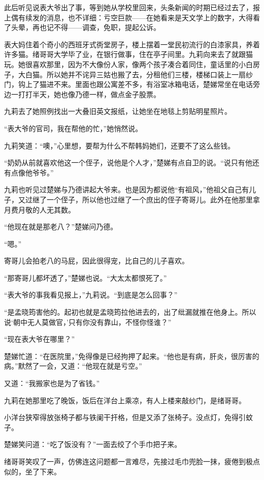 \par 此后听见说表大爷出了事，等到她从学校里回来，头条新闻的时期已经过去了，报上偶有续发的消息，也不详细：亏空巨款——在她看来是天文学上的数字，大得看了头晕，再也记不得——调查，免职，提起公诉。
\par 表大妈住着个奇小的西班牙式衖堂房子，楼上摆着一堂民初流行的白漆家具，养着许多猫。绪哥哥大学毕了业，在银行做事，住在亭子间里。九莉向来去了就跟猫玩。她很喜欢那里，因为不大像份人家，像两个孩子凑合着同住，童话里的小白房子，大白猫。所以她并不诧异三姑也搬了去，分租他们三楼，楼梯口装上一扇纱门，钩上了猫进不来。里面也跟公寓差不多，有浴室冰箱电话，楚娣常坐在电话旁边一打打半天，她也像乃德一样，做点金子股票。
\par 九莉去了她照例找出一大叠旧英文报纸，让她坐在地毯上剪贴明星照片。
\par “表大爷的官司，我在帮他的忙，”她悄然说。
\par 九莉笑道：“噢，”心里想，要帮为什么不帮韩妈她们，还要不了这么些钱。
\par “奶奶从前就喜欢他这一个侄子，说他是个人才，”楚娣有点自卫的说。“说只有他还有点像他爷爷。”
\par 九莉也听见过楚娣与乃德讲起大爷来。也是因为都说他“有祖风，”他祖父自己有儿子，又过继了一个侄子，所以他也过继了一个庶出的侄子寄哥儿。此外在他那里拿月费月敬的人无其数。
\par “他现在就是那老八？”楚娣问乃德。
\par “嗯。”
\par 寄哥儿会拍老八的马屁，因此很得宠，比自己的儿子喜欢。
\par “那寄哥儿都坏透了，”楚娣也说。“大太太都恨死了。”
\par “表大爷的事我看见报上，”九莉说。“到底是怎么回事？”
\par “是孟晓筠害他的。起初也就是孟晓筠拉他进去的，出了纰漏就推在他身上。所以说‘朝中无人莫做官，’只有你没有靠山，不怪你怪谁？”
\par “现在表大爷在哪里？”
\par 楚娣忙道：“在医院里，”免得像是已经拘押了起来。“他也是有病，肝炎，很厉害的病。”默然了一会，又道：“他现在就是亏空。”
\par 又道：“我搬家也是为了省钱。”
\par 九莉在她那里吃了晚饭，饭后在洋台上乘凉，有人上楼来敲纱门，是绪哥哥。
\par 小洋台狭窄得放张椅子都与铁阑干扞格，但是又添了张椅子。没点灯，免得引蚊子。
\par 楚娣笑问道：“吃了饭没有？”一面去绞了个手巾把子来。
\par 绪哥哥笑叹了一声，仿佛连这问题都一言难尽，先接过毛巾兜脸一抹，疲倦到极点似的，坐了下来。
